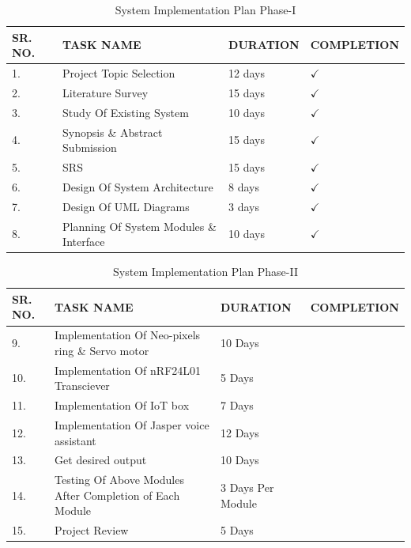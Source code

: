 \documentclass[12pt]{extreport}
\begin{document}
\begin{table}[ht]
\caption{System Implementation Plan Phase-I}
\vspace{1em}
\begin{tabular}{ |p{2cm}|p{7cm}|p{2.5cm}|p{3.2cm}|  }
 \hline
 \textbf{SR. NO.} & \textbf{TASK NAME} & \textbf{DURATION} & \textbf{COMPLETION}\\
 \hline
 


  1. & Project Topic Selection &  12 days & $\checkmark$\\
  \hline
  2. & Literature Survey&  15 days& $\checkmark$\\
  \hline
  3. & Study Of Existing System  &  10 days & $\checkmark$\\
  \hline
  4. & Synopsis \& Abstract Submission  &  15 days & $\checkmark$\\
  \hline
   5. & SRS   &  15 days & $\checkmark$\\
   \hline
   6. & Design Of System Architecture &  8 days & $\checkmark$\\
  \hline
  7. & Design Of UML Diagrams  &  3 days & $\checkmark$\\
  \hline
    8. & Planning Of System Modules \& Interface &  10 days & $\checkmark$\\
  \hline
 
  
  
 
 \end{tabular}
 
\end{table}

\begin{table}[ht]
\caption{System Implementation Plan Phase-II}
\vspace{1em}
\begin{tabular}{ |p{2cm}|p{7cm}|p{2.5cm}|p{3.2cm}|  }
 \hline
 \textbf{SR. NO.} & \textbf{TASK NAME} & \textbf{DURATION} & \textbf{COMPLETION}\\
 \hline
 
 9.& Implementation Of Neo-pixels ring \& Servo motor  &	10 Days	& \\
 \hline
 
10. &Implementation Of nRF24L01 Transciever &	5 Days	&\\
\hline

11. &Implementation Of IoT box	& 7 Days& \\
\hline	
12.&Implementation Of Jasper voice assistant	& 12 Days & \\
\hline
13. & Get desired output &	10 Days	& \\
\hline
14. & Testing Of Above Modules After Completion of Each Module &	3 Days Per Module	& \\
\hline
15. & Project Review &	5 Days & \\
\hline
 \end{tabular}
 
\end{table}
\end{document}
